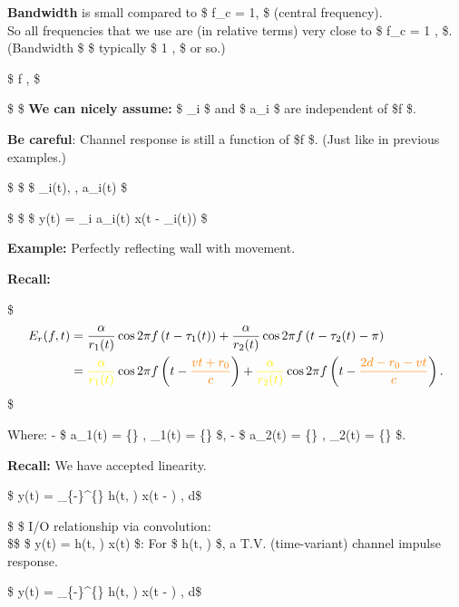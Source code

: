 \documentclass[11pt]{article}
\begin{document}
{\textbf{Bandwidth} is small compared to \$ f\_c = 1,  \$
(central frequency).\\
So all frequencies that we use are (in relative terms) very close to \$
f\_c = 1 ,  \$.\\
(Bandwidth \$  \$ typically \$ 1 ,  \$ or so.)

\$ \Rightarrow f
  ,
 \$

\$ \Rightarrow\$ \textbf{We can nicely assume:} \$ \tau\_i \$ and \$
a\_i \$ are independent of \$\color{orange}f \$.

\textbf{Be careful}: Channel response is still a function of
\$\color{orange}f \$. (Just like in previous examples.)

\$ \Rightarrow\$ \$ \tau\_i(t), , a\_i(t) \$

\$ \Rightarrow\$ \$ y(t) = \sum\_i a\_i(t) \cdot x(t - \tau\_i(t)) \$

    \textbf{Example:} Perfectly reflecting wall with movement.

\textbf{Recall:}

\$ \begin{align}
E_r(f, t) &= \frac{\alpha}{r_1(t)} \cos 2 \pi f \left(t - \tau_1(t)\right) + \frac{\alpha}{r_2(t)} \cos 2 \pi f \left(t - \tau_2(t) - \pi\right) \\
&= {\color{yellow}\frac{\alpha}{r_1(t)}} \cos 2 \pi f \left(t - {\color{orange}\frac{v t + r_0}{c}}\right) + {\color{yellow}\frac{\alpha}{r_2(t)}} \cos 2 \pi f \left(t - {\color{orange}\frac{2d - r_0 - v t}{c}}\right).
\end{align} \$

Where: - \$ a\_1(t) = \{\color{yellow}\} ,
\tau\_1(t) = \{\color{orange}\} \$, - \$ a\_2(t) =
\{\color{yellow}\} , \tau\_2(t) =
\{\color{orange}\} \$.

\textbf{Recall:} We have accepted linearity.

\$ y(t) = \int\_\{-\infty\}\^{}\{\infty\} h(t, \tau) \cdot x(t - \tau) ,
d\tau \$

\$ \implies \$ I/O relationship via convolution:\\
\$\qquad \$ \$ y(t) = h(t, \tau) \ast x(t) \$: For \$ h(t, \tau) \$, a
T.V. (time-variant) channel impulse response.

\$ y(t) = \int\limits\_\{-\infty\}\^{}\{\infty\} h(t, \tau) \cdot x(t -
\tau) , d\tau  \$

}
\end{document}
